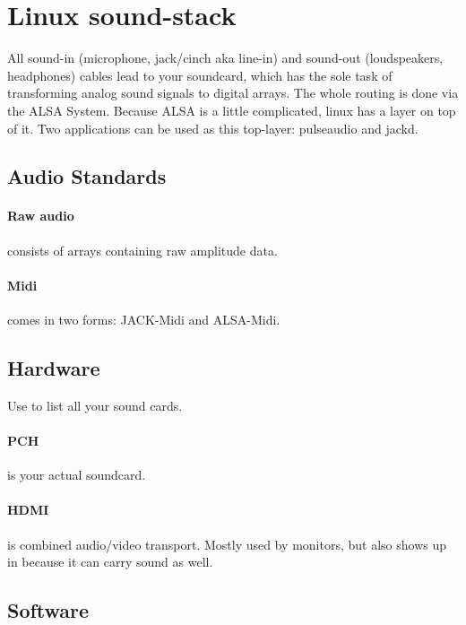 \section{Linux sound-stack}


All sound-in (microphone, jack/cinch aka line-in) and sound-out (loudspeakers, headphones) cables lead to your soundcard, which has the sole task of transforming analog sound signals to digital  arrays. The whole routing is done via the ALSA System. 
Because ALSA is a little complicated, linux has a layer on top of it. Two applications can be used as this top-layer: pulseaudio and jackd.  

\subsection{Audio Standards}

\paragraph{Raw audio} consists of  arrays containing raw amplitude data. 

\paragraph{Midi} comes in two forms: JACK-Midi and ALSA-Midi.

\subsection{Hardware}

Use  to list all your sound cards. 

\paragraph{PCH} is your actual soundcard. 

\paragraph{HDMI} is combined audio/video transport. Mostly used by monitors, but also shows up in  because it can carry sound as well. 

\subsection{Software}


